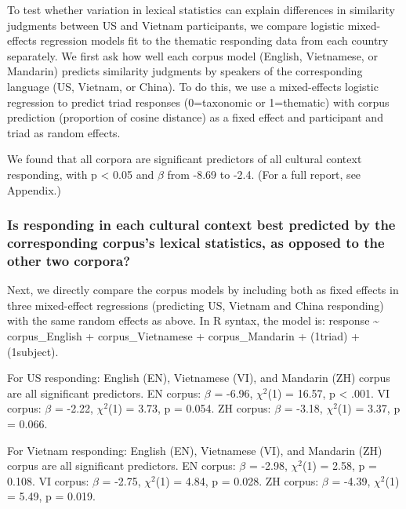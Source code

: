 \documentclass[10pt, letterpaper]{article}
\begin{document}
To test whether variation in lexical statistics can explain differences
in similarity judgments between US and Vietnam participants, we compare
logistic mixed-effects regression models fit to the thematic responding
data from each country separately. We first ask how well each corpus
model (English, Vietnamese, or Mandarin) predicts similarity judgments
by speakers of the corresponding language (US, Vietnam, or China). To do
this, we use a mixed-effects logistic regression to predict triad
responses (0=taxonomic or 1=thematic) with corpus prediction (proportion
of cosine distance) as a fixed effect and participant and triad as
random effects.

We found that all corpora are significant predictors of all cultural
context responding, with p \textless{} 0.05 and \(\beta\) from -8.69 to
-2.4. (For a full report, see Appendix.)

\hypertarget{is-responding-in-each-cultural-context-best-predicted-by-the-corresponding-corpuss-lexical-statistics-as-opposed-to-the-other-two-corpora}{%
\subsubsection{Is responding in each cultural context best predicted by
the corresponding corpus's lexical statistics, as opposed to the other
two
corpora?}\label{is-responding-in-each-cultural-context-best-predicted-by-the-corresponding-corpuss-lexical-statistics-as-opposed-to-the-other-two-corpora}}

Next, we directly compare the corpus models by including both as fixed
effects in three mixed-effect regressions (predicting US, Vietnam and
China responding) with the same random effects as above. In R syntax,
the model is: response \textasciitilde{} corpus\_English +
corpus\_Vietnamese + corpus\_Mandarin + (1\textbar triad) +
(1\textbar subject).

For US responding: English (EN), Vietnamese (VI), and Mandarin (ZH)
corpus are all significant predictors. EN corpus: \(\beta\) = -6.96,
\(\chi^2\)(1) = 16.57, p \textless{} .001. VI corpus: \(\beta\) = -2.22,
\(\chi^2\)(1) = 3.73, p = 0.054. ZH corpus: \(\beta\) = -3.18,
\(\chi^2\)(1) = 3.37, p = 0.066.

For Vietnam responding: English (EN), Vietnamese (VI), and Mandarin (ZH)
corpus are all significant predictors. EN corpus: \(\beta\) = -2.98,
\(\chi^2\)(1) = 2.58, p = 0.108. VI corpus: \(\beta\) = -2.75,
\(\chi^2\)(1) = 4.84, p = 0.028. ZH corpus: \(\beta\) = -4.39,
\(\chi^2\)(1) = 5.49, p = 0.019.
\end{document}
